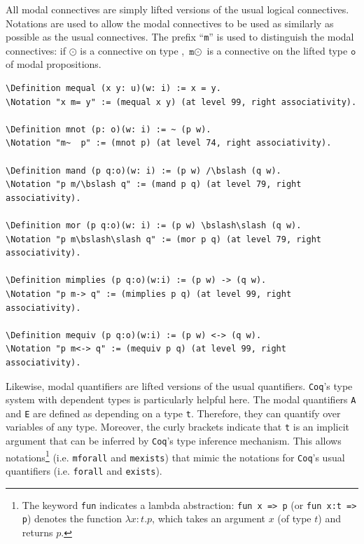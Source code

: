 \documentclass{llncs}
\newcommand{\red}[1]{\textcolor[rgb]{1,0,0}{#1}}
\newcommand{\blue}[1]{\textcolor[rgb]{0,0,1}{#1}}
\newcommand{\Definition}{\red{Definition}}
\newcommand{\Notation}{\blue{Notation}}
\newcommand{\fun}{\blue{fun}}
\newcommand{\bslash}{\symbol{92}}
\newcommand{\Coq}{\texttt{Coq}\xspace}
\begin{document}
\noindent 
All modal connectives are simply lifted versions of the
usual logical connectives. Notations are used to allow the modal
connectives to be used as similarly as possible as the usual
connectives. The prefix ``\texttt{m}'' is used to distinguish the
modal connectives: if $\odot$ is a connective on type ,
$\texttt{m}\odot$ is a connective on the lifted type $\texttt{o}$ of
modal propositions.

\begin{Verbatim}[commandchars=\\\{\},fontsize=\verbsize]
\Definition mequal (x y: u)(w: i) := x = y.
\Notation "x m= y" := (mequal x y) (at level 99, right associativity).

\Definition mnot (p: o)(w: i) := ~ (p w).
\Notation "m~  p" := (mnot p) (at level 74, right associativity).

\Definition mand (p q:o)(w: i) := (p w) /\bslash (q w).
\Notation "p m/\bslash q" := (mand p q) (at level 79, right associativity).

\Definition mor (p q:o)(w: i) := (p w) \bslash\slash (q w).
\Notation "p m\bslash\slash q" := (mor p q) (at level 79, right associativity).

\Definition mimplies (p q:o)(w:i) := (p w) -> (q w).
\Notation "p m-> q" := (mimplies p q) (at level 99, right associativity).

\Definition mequiv (p q:o)(w:i) := (p w) <-> (q w).
\Notation "p m<-> q" := (mequiv p q) (at level 99, right associativity).
\end{Verbatim}

\noindent 
Likewise, modal quantifiers are lifted versions of the usual
quantifiers. \Coq's type system with dependent types is particularly
helpful here. The modal quantifiers \texttt{A} and \texttt{E} are
defined as depending on a type \texttt{t}. Therefore, they can
quantify over variables of any type. Moreover, the curly brackets
indicate that \texttt{t} is an implicit argument that can be inferred
by \Coq's type inference mechanism. This allows notations\footnote{The
keyword \texttt{\fun} indicates a lambda abstraction: \texttt{\fun \ x
=> p} (or \texttt{\fun \ x:t => p}) denotes the function 
$\lambda x:t.p$, which takes an argument $x$ (of type $t$) and returns $p$.}
(i.e. \texttt{mforall} and \texttt{mexists}) that mimic the notations
for \Coq's usual quantifiers (i.e. \texttt{forall} and
\texttt{exists}).
\end{document}
